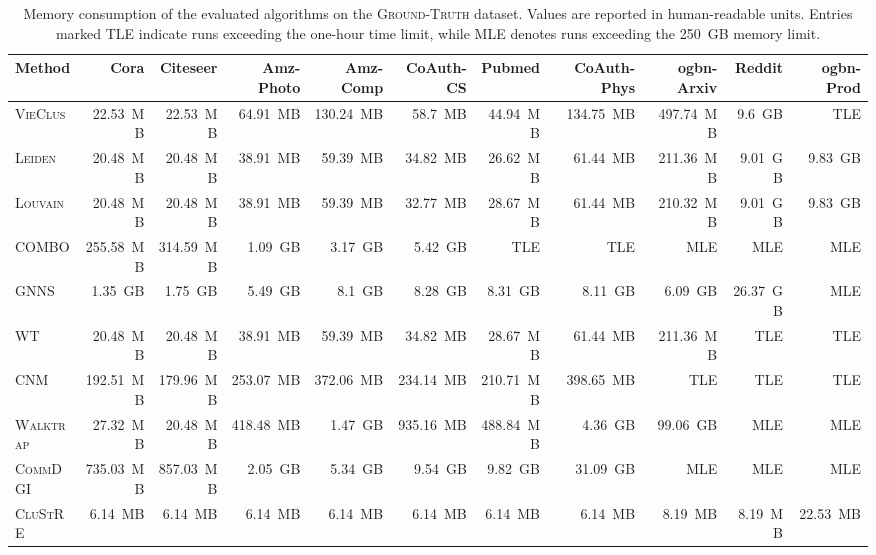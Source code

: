 \documentclass[../paper.tex]{subfiles}
\begin{document}
\setlength{\tabcolsep}{4.5pt}

\begin{table}[H]
    \caption{Memory consumption of the evaluated algorithms on the \textsc{Ground-Truth} dataset. Values are reported in human-readable units. Entries marked \textsc{TLE} indicate runs exceeding the one-hour time limit, while \textsc{MLE} denotes runs exceeding the 250~GB memory limit. }
    \label{tab:memory}
    \small
    \begin{tabular}{l|rrrrrrrrrr}
        \toprule
        Method             & Cora      & Citeseer  & Amz-Photo & Amz-Comp  & CoAuth-CS & Pubmed    & CoAuth-Phys & ogbn-Arxiv & Reddit    & ogbn-Prod \\
        \midrule
        \textsc{VieClus}   & 22.53~MB  & 22.53~MB  & 64.91~MB  & 130.24~MB & 58.7~MB   & 44.94~MB  & 134.75~MB   & 497.74~MB  & 9.6~GB    & TLE       \\
        \textsc{Leiden}    & 20.48~MB  & 20.48~MB  & 38.91~MB  & 59.39~MB  & 34.82~MB  & 26.62~MB  & 61.44~MB    & 211.36~MB  & 9.01~GB   & 9.83~GB   \\
        \textsc{Louvain}   & 20.48~MB  & 20.48~MB  & 38.91~MB  & 59.39~MB  & 32.77~MB  & 28.67~MB  & 61.44~MB    & 210.32~MB  & 9.01~GB   & 9.83~GB   \\
        \textsc{COMBO}     & 255.58~MB & 314.59~MB & 1.09~GB   & 3.17~GB   & 5.42~GB   & TLE       & TLE         & MLE        & MLE       & MLE       \\
        \textsc{GNNS}      & 1.35~GB   & 1.75~GB   & 5.49~GB   & 8.1~GB    & 8.28~GB   & 8.31~GB   & 8.11~GB     & 6.09~GB    & 26.37~GB  & MLE       \\
        \textsc{WT}        & 20.48~MB  & 20.48~MB  & 38.91~MB  & 59.39~MB  & 34.82~MB  & 28.67~MB  & 61.44~MB    & 211.36~MB  & TLE       & TLE       \\
        \textsc{CNM}       & 192.51~MB & 179.96~MB & 253.07~MB & 372.06~MB & 234.14~MB & 210.71~MB & 398.65~MB   & TLE        & TLE       & TLE       \\
        \textsc{Walktrap}  & 27.32~MB  & 20.48~MB  & 418.48~MB & 1.47~GB   & 935.16~MB & 488.84~MB & 4.36~GB     & 99.06~GB   & MLE       & MLE       \\
        \textsc{CommDGI}   & 735.03~MB & 857.03~MB & 2.05~GB   & 5.34~GB   & 9.54~GB   & 9.82~GB   & 31.09~GB    & MLE        & MLE       & MLE       \\
        \textsc{CluStRE}   & 6.14~MB   & 6.14~MB   & 6.14~MB   & 6.14~MB   & 6.14~MB   & 6.14~MB   & 6.14~MB     & 8.19~MB    & 8.19~MB   & 22.53~MB  \\

\end{tabular}
\end{table}
\end{document}
